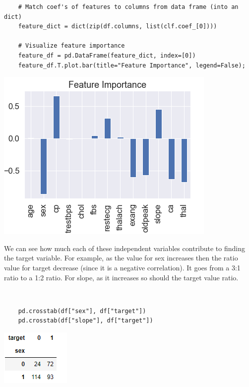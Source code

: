 \documentclass[11pt, a4paper]{article}
\begin{document}
\begin{spacing}{1.1}
\begin{lstlisting}
	# Match coef's of features to columns from data frame (into an dict)
	feature_dict = dict(zip(df.columns, list(clf.coef_[0])))
	
	# Visualize feature importance
	feature_df = pd.DataFrame(feature_dict, index=[0])
	feature_df.T.plot.bar(title="Feature Importance", legend=False); \end{lstlisting} \vspace*{1mm}
	\begin{minipage}[c]{9cm}
	\includegraphics[scale=.8]{feat_mp}
	\end{minipage}
	\begin{minipage}[c]{8cm}
	We can see how much each of these independent variables contribute to finding the target variable. For example, as the value for sex increases then the ratio value for target decrease (since it is a negative correlation). It goes from a 3:1 ratio to a 1:2 ratio. For slope, as it increases so should the target value ratio.
	\end{minipage} \vspace*{1mm} \\
	\begin{minipage}[c]{9cm}
	\begin{lstlisting}
	pd.crosstab(df["sex"], df["target"])
	pd.crosstab(df["slope"], df["target"]) \end{lstlisting} \vspace*{1mm}
	\end{minipage}
	\begin{minipage}[c]{8cm}
	\hspace*{5mm} \includegraphics[scale=.8]{crosstab1_mp} \hspace*{2mm}

\end{minipage}
\end{spacing}
\end{document}
